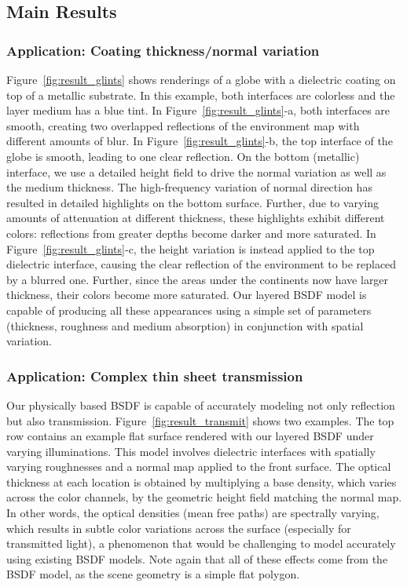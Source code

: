 


\subsection{Main Results}
\label{subsec:res_main}

\subsubsection{Application: Coating thickness/normal variation}
%
Figure~\ref{fig:result_glints} shows renderings of a globe with a dielectric coating on top of a metallic substrate.
In this example, both interfaces are colorless and the layer medium has a blue tint.
In Figure~\ref{fig:result_glints}-a, both interfaces are smooth, creating two overlapped reflections of the environment map with different amounts of blur.
In Figure~\ref{fig:result_glints}-b, the top interface of the globe is smooth, leading to one clear reflection.
On the bottom (metallic) interface, we use a detailed height field to drive the normal variation as well as the medium thickness.
The high-frequency variation of normal direction has resulted in detailed highlights on the bottom surface.
Further, due to varying amounts of attenuation at different thickness, these highlights exhibit different colors: reflections from greater depths become darker and more saturated. 
In Figure~\ref{fig:result_glints}-c, the height variation is instead applied to the top dielectric interface, causing the clear reflection of the environment to be replaced by a blurred one.
Further, since the areas under the continents now have larger thickness, their colors become more saturated.
Our layered BSDF model is capable of producing all these appearances using a simple set of parameters (thickness, roughness and medium absorption) in conjunction with spatial variation.

 
	

\subsubsection{Application: Complex thin sheet transmission}
%
Our physically based BSDF is capable of accurately modeling not only reflection but also transmission.
Figure~\ref{fig:result_transmit} shows two examples.
The top row contains an example flat surface rendered with our layered BSDF under varying illuminations.
This model involves dielectric interfaces with spatially varying roughnesses and a normal map applied to the front surface.
The optical thickness at each location is obtained by multiplying a base density, which varies across the color channels, by the geometric height field matching the normal map.
In other words, the optical densities (mean free paths) are spectrally varying, which results in subtle color variations across the surface (especially for transmitted light), a phenomenon that would be challenging to model accurately using existing BSDF models. Note again that all of these effects come from the BSDF model, as the scene geometry is a simple flat polygon.

